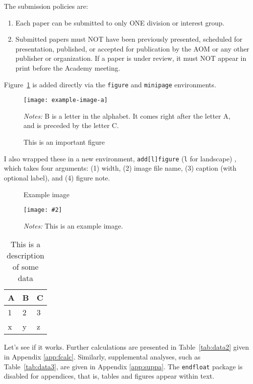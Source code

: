 \documentclass[
    12pt,
    letterpaper
]{article}
\theoremstyle{plain}
\newenvironment{lfigure}[1][h]{
    \begin{landscape}
        \begin{figure}[#1]
}{
        \end{figure}
    \end{landscape}
}
\newcommand\figurenote[2][width=\linewidth]{
    \captionsetup{#1,font=small}
    \caption*{\textit{Notes:} {#2}}
}
\newenvironment{addlfigure}[4]{
    \begin{lfigure}[h]
        \centering
        \caption{#3}
        \begin{minipage}{#1}
            \texttt{[image: \#2]}
            \figurenote{#4}
}{
        \end{minipage}
    \end{lfigure}
}
\begin{document}
\blindtext

The submission policies are:
\begin{enumerate}
    \item Each paper can be submitted to only ONE division or interest group.
    \item Submitted papers must NOT have been previously presented, scheduled for presentation, published, or accepted for publication by the AOM or any other publisher or organization. If a paper is under review, it must NOT appear in print before the Academy meeting.
\end{enumerate}

Figure~\ref{fig:a} is added directly via the \verb*|figure| and \verb*|minipage| environments.

\begin{figure}[h]
    \centering
    \caption{This is an important figure}\label{fig:a}
    \begin{minipage}{.5\linewidth}
    \texttt{[image: example-image-a]}
    \figurenote{B is a letter in the alphabet. It comes right after the letter A, and is preceded by the letter C. \blindtext}
    \end{minipage}
\end{figure}

I also wrapped these in a new environment, \verb*|add[l]figure| (\verb*|l| for landscape) , which takes four arguments: (1) width, (2) image file name, (3) caption (with optional label), and (4) figure note.

\begin{addlfigure}{0.25\linewidth}
	{example-image-b}{Example image\label{fig:b}}
	{This is an example image. \blindtext}
\end{addlfigure}

\blindtext

\begin{table}[h]
    \centering
    \caption{This is a description of some data}
    \label{tab:data1}
    \begin{tabular}{|l|l|l|}
        \hline
        A & B & C \\ \hline \hline
        1 & 2 & 3 \\ \hline
        x & y & z \\ \hline
    \end{tabular}
\end{table}

Let's see if it works. Further calculations are presented in Table~\ref{tab:data2} given in Appendix \ref{app:fcalc}. Similarly, supplemental analyses, such as Table~\ref{tab:data3}, are given in Appendix \ref{app:suppa}. The \verb*|endfloat| package is disabled for appendices, that is, tables and figures appear within text.
\end{document}
